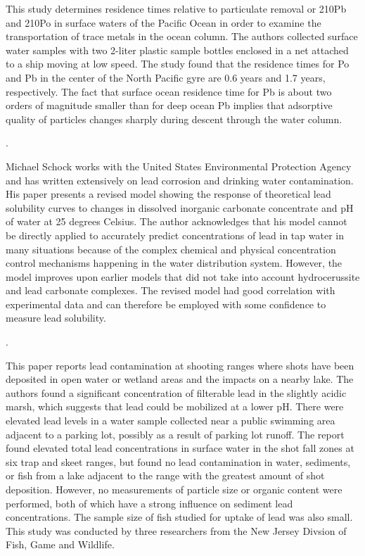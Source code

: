 \documentclass{article}
\begin{document}
This study determines residence times relative to particulate removal or 210Pb and 210Po in surface waters of the Pacific Ocean in order to examine the transportation of trace metals in the ocean column. The authors collected surface water samples with two 2-liter plastic sample bottles enclosed in a net attached to a ship moving at low speed. The study found that the residence times for Po and Pb in the center of the North Pacific gyre are 0.6 years and 1.7 years, respectively. The fact that surface ocean residence time for Pb is about two orders of magnitude smaller than for deep ocean Pb implies that adsorptive quality of particles changes sharply during descent through the water column.

\medskip
\noindent {}.
\medskip

Michael Schock works with the United States Environmental Protection Agency and has written extensively on lead corrosion and drinking water contamination. His paper presents a revised model showing the response of theoretical lead solubility curves to changes in dissolved inorganic carbonate concentrate and pH of water at 25 degrees Celsius. The author acknowledges that his model cannot be directly applied to accurately predict concentrations of lead in tap water in many situations because of the complex chemical and physical concentration control mechanisms happening in the water distribution system. However, the model improves upon earlier models that did not take into account hydrocerussite and lead carbonate complexes. The revised model had good correlation with experimental data and can therefore be employed with some confidence to measure lead solubility.

\medskip
\noindent {}.
\medskip

This paper reports lead contamination at shooting ranges where shots have been deposited in open water or wetland areas and the impacts on a nearby lake. The authors found a significant concentration of filterable lead in the slightly acidic marsh, which suggests that lead could be mobilized at a lower pH. There were elevated lead levels in a  water sample collected near a public swimming area adjacent to a parking lot, possibly as a result of parking lot runoff. The report found elevated total lead concentrations in surface water in the shot fall zones at six trap and skeet ranges, but found no lead contamination in water, sediments, or fish from a lake adjacent to the range with the greatest amount of shot deposition. However, no measurements of particle size or organic content were performed, both of which have a strong influence on sediment lead concentrations. The sample size of fish studied for uptake of lead was also small. This study was conducted by three researchers from the New Jersey Divsion of Fish, Game and Wildlife. 
\end{document}
